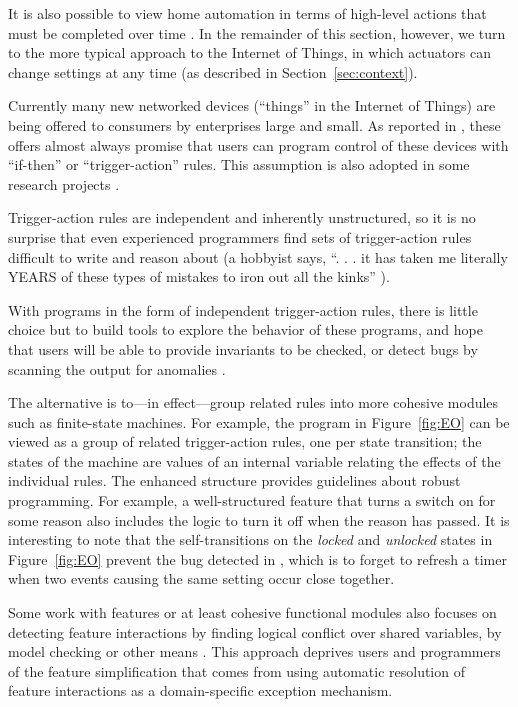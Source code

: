\documentclass[conference]{IEEEtran}
\begin{document}
It is also possible to view home automation in terms of high-level
actions that must be completed over time \cite{homecare}.
In the remainder of this section, however, we turn to the more
typical approach to the Internet of Things, in
which actuators can change settings at any time
(as described in Section~\ref{sec:context}).

Currently many new networked
devices (``things'' in the Internet of Things) are being offered
to consumers by enterprises large and small.
As reported in \cite{tapchi}, these offers almost always promise
that users can 
program control of these
devices with ``if-then'' or ``trigger-action'' rules.
This assumption is also adopted in some research projects
\cite{mahajan,kolberg2002,tapchi}.

Trigger-action rules are independent and inherently unstructured,
so it is no surprise that even experienced programmers find
sets of trigger-action
rules difficult to write and reason about (a hobbyist says, ``. . .
it has taken me literally YEARS of these types of mistakes to iron
out all the kinks'' \cite{mahajan}).

With programs in the form of independent trigger-action rules, there
is little choice but to build tools to explore the behavior of these
programs, and hope that users will be able to provide invariants to be
checked, or detect bugs by scanning the output for 
anomalies \cite{mahajan}.

The alternative is to---in effect---group related rules into
more cohesive modules such as finite-state machines.
For example, the program in Figure~\ref{fig:EO} can be viewed as a
group of related trigger-action rules, one per state transition;
the states of the machine are values of an internal variable relating
the effects of the individual rules.
The enhanced structure provides guidelines about robust programming.
For example, a well-structured feature that turns a switch on for some
reason also includes the logic to turn it off when the reason has passed.
It is interesting to note that the self-transitions on the {\it locked}
and {\it unlocked} states in Figure~\ref{fig:EO} prevent the bug
detected in \cite{mahajan}, which is to forget to refresh a timer when
two events causing the same setting occur close together.

Some work with features or at least cohesive functional 
modules also focuses
on detecting feature interactions by finding logical conflict over
shared variables, by model checking or other means 
\cite{leelaprute,soares}.
This approach deprives users and programmers of the
feature simplification
that comes from using automatic resolution of feature interactions
as a domain-specific exception
mechanism.
\end{document}
